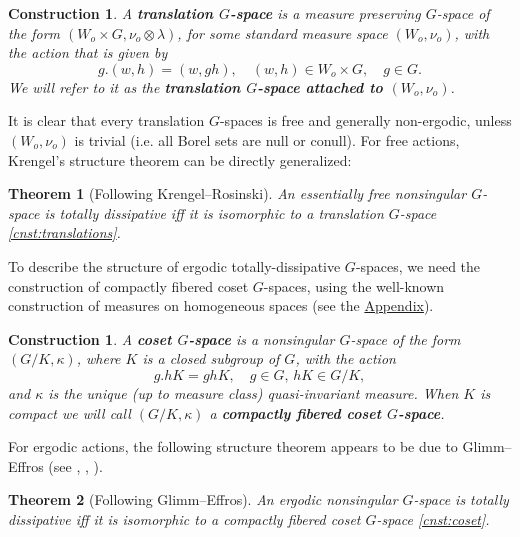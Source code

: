 \documentclass{amsart}
\numberwithin{equation}{subsection}
\newtheorem{con}[thm]{Construction}
\newtheorem{mainthm}{Theorem}
\renewcommand{\themainthm}{\Alph{mainthm}}
\begin{document}
\begin{con}
\label{cnst:translations}
A {\bf translation \(G\)-space} is a measure preserving \(G\)-space of the form \(\left(W_{o}\times G,\nu_{o}\otimes\lambda\right)\), for some standard measure space \(\left(W_{o},\nu_{o}\right)\), with the action that is given by
\[g.\left(w,h\right)=\left(w,gh\right),\quad\left(w,h\right)\in W_{o}\times G,\quad g\in G.\]
We will refer to it as the {\bf translation \(G\)-space attached to \(\left(W_{o},\nu_{o}\right)\)}.
\end{con}

It is clear that every translation \(G\)-spaces is free and generally non-ergodic, unless \(\left(W_{o},\nu_{o}\right)\) is trivial (i.e. all Borel sets are null or conull). For free actions, Krengel's structure theorem can be directly generalized:

\renewcommand{\themainthm}{E}
\begin{mainthm}[Following Krengel--Rosinski]
\label{mthm:krengel}
An \emph{essentially free} nonsingular \(G\)-space is totally dissipative iff it is isomorphic to a translation \(G\)-space \eqref{cnst:translations}.
\end{mainthm}
\renewcommand{\themainthm}{\Alph{mainthm}}

To describe the structure of ergodic totally-dissipative \(G\)-spaces, we need the construction of compactly fibered coset \(G\)-spaces, using the well-known construction of measures on homogeneous spaces (see the \hyperref[Appendix: Measures on Homogeneous Spaces]{Appendix}).

\begin{con}
\label{cnst:coset}
A {\bf coset \(G\)-space} is a nonsingular \(G\)-space of the form \(\left(G/K,\kappa\right)\), where \(K\) is a closed subgroup of \(G\), with the action
\[g.hK=ghK,\quad g\in G,\,hK\in G/K,\]
and \(\kappa\) is the unique (up to measure class) quasi-invariant measure. When \(K\) is compact we will call \(\left(G/K,\kappa\right)\) a {\bf compactly fibered coset \(G\)-space}.
\end{con}

For ergodic actions, the following structure theorem appears to be due to Glimm--Effros (see \cite[Definition 5.2]{feldman1978orbit}, \cite[Prop. 2.1.10]{zimmer2013ergodic}, \cite[Thm. 9.12]{nadkarni2013basic}).

\renewcommand{\themainthm}{F}
\begin{mainthm}[Following Glimm--Effros]
\label{mthm:glimmeffros}
An \emph{ergodic} nonsingular \(G\)-space is totally dissipative iff it is isomorphic to a compactly fibered coset \(G\)-space \eqref{cnst:coset}.
\end{mainthm}
\renewcommand{\themainthm}{\Alph{mainthm}}
\end{document}
